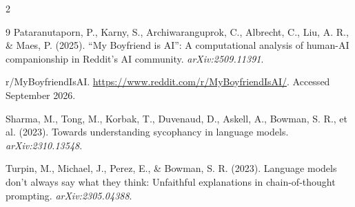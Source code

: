 \documentclass[11pt]{article}
\begin{document}
\begin{multicols}{2}
{\begin{thebibliography}{9}
 Pataranutaporn, P., Karny, S., Archiwaranguprok, C., Albrecht, C., Liu, A. R., \& Maes, P. (2025). ``My Boyfriend is AI'': A computational analysis of human-AI companionship in Reddit's AI community. \textit{arXiv:2509.11391}.

 r/MyBoyfriendIsAI. \url{https://www.reddit.com/r/MyBoyfriendIsAI/}. Accessed September 2026.

 Sharma, M., Tong, M., Korbak, T., Duvenaud, D., Askell, A., Bowman, S. R., et al. (2023). Towards understanding sycophancy in language models. \textit{arXiv:2310.13548}.

 Turpin, M., Michael, J., Perez, E., \& Bowman, S. R. (2023). Language models don't always say what they think: Unfaithful explanations in chain-of-thought prompting. \textit{arXiv:2305.04388}.

\end{thebibliography}
}

\end{multicols}
\end{document}
